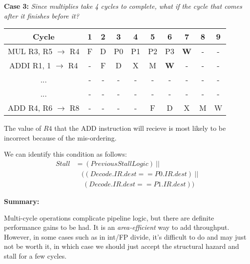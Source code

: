 \documentclass[12pt]{article}
\newenvironment{QandA}{\begin{enumerate}[label=\bfseries\arabic*.]\bfseries}
                      {\end{enumerate}}
\newenvironment{answered}{\par\quad\normalfont}{}
\begin{document}
\begin{QandA}
\begin{answered}
    \textbf{Case 3:} \textit{Since multiplies take 4 cycles to complete, what if the cycle that comes after it finishes before it?}
    \begin{center}
    \begin{tabular}{ |c|c|c|c|c|c|c|c|c|c| } 
     \hline
     Cycle & 1 & 2 & 3 & 4 & 5 & 6 & 7 & 8 & 9\\ 
     \hline
     MUL R3, R5 $\rightarrow$ R4 & F & D & P0 & P1 & P2 & P3 & \textbf{W} & - & -\\ 
     ADDI R1, 1 $\rightarrow$ R4 & - & F & D & X & M & \textbf{W} & - & - & - \\ 
     ... & - & - & - & - & - & - & - & - & - \\
     ... & - & - & - & - & - & - & - & - & - \\
     ADD R4, R6 $\rightarrow$ R8 & - & - & - & - & F & D & X & M & W \\ 
     \hline
    \end{tabular}
    \end{center} 
    
    The value of $R4$ that the ADD instruction will recieve is most likely to be incorrect because of the mis-ordering.
    
    We can identify this condition as follows:
    \begin{equation*}
    \begin{split}
    Stall & = (PreviousStallLogic)\ || \\ &\ \ \ \ ((Decode.IR.dest == P0.IR.dest)\ || \\  &\ \ \ \ \ (Decode.IR.dest == P1.IR.dest))\ 
    \end{split}
    \end{equation*} 
    
    \textbf{Summary:} 
    
    Multi-cycle operations complicate pipeline logic, but there are definite performance gains to be had. It is an \textit{area-efficient} way to add throughput. However, in some cases such as in int/FP divide, it's difficult to do and may just not be worth it, in which case we should just accept the structural hazard and stall for a few cycles. 
    \end{answered}
\end{QandA}

\newpage 
\end{document}
